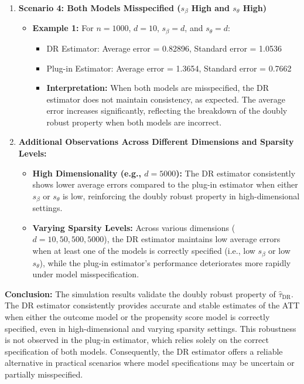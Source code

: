 \documentclass{article}
\begin{document}
\begin{enumerate}
  \item \textbf{Scenario 4: Both Models Misspecified (\( s_\beta \) High and \( s_\theta \) High)}
    \begin{itemize}
      \item \textbf{Example 1:} For \( n = 1000 \), \( d = 10 \), \( s_\beta = d \), and \( s_\theta = d \):
        \begin{itemize}
          \item DR Estimator: Average error = 0.82896, Standard error = 1.0536
          \item Plug-in Estimator: Average error = 1.3654, Standard error = 0.7662
          \item \textbf{Interpretation:} When both models are misspecified, the DR estimator does not maintain consistency, as expected. The average error increases significantly, reflecting the breakdown of the doubly robust property when both models are incorrect.
        \end{itemize}
    \end{itemize}

  \item \textbf{Additional Observations Across Different Dimensions and Sparsity Levels:}
    \begin{itemize}
      \item \textbf{High Dimensionality (e.g., \( d = 5000 \)):} The DR estimator consistently shows lower average errors compared to the plug-in estimator when either \( s_\beta \) or \( s_\theta \) is low, reinforcing the doubly robust property in high-dimensional settings.
      \item \textbf{Varying Sparsity Levels:} Across various dimensions (\( d = 10, 50, 500, 5000 \)), the DR estimator maintains low average errors when at least one of the models is correctly specified (i.e., low \( s_\beta \) or low \( s_\theta \)), while the plug-in estimator's performance deteriorates more rapidly under model misspecification.
    \end{itemize}
\end{enumerate}

\textbf{Conclusion:}
The simulation results validate the doubly robust property of \( \hat{\tau}_{\text{DR}} \). The DR estimator consistently provides accurate and stable estimates of the ATT when either the outcome model or the propensity score model is correctly specified, even in high-dimensional and varying sparsity settings. This robustness is not observed in the plug-in estimator, which relies solely on the correct specification of both models. Consequently, the DR estimator offers a reliable alternative in practical scenarios where model specifications may be uncertain or partially misspecified.
\end{document}
